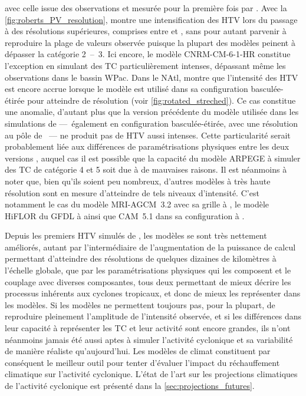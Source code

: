 \documentclass[../main.tex]{subfiles}
\begin{document}
avec celle issue des observations et mesurée pour la première fois par \textcite{atkinson_tropical_1977}. Avec la \cref{fig:roberts_PV_resolution},
\textcite{roberts_impact_2020} montre une intensification des HTV lors du passage à des résolutions supérieures, comprises entre  et , sans pour
autant parvenir à reproduire la plage de valeurs observée puisque la plupart des modèles peinent à dépasser la catégorie \num{2}~--~\num{3}. Ici encore, le
modèle CNRM-CM-6-1-HR constitue l'exception en simulant des TC particulièrement intenses, dépassant même les observations dans le bassin WPac. Dans le NAtl,
\textcite{chauvin_future_2020} montre que l'intensité des HTV est encore accrue lorsque le modèle est utilisé dans sa configuration basculée-étirée pour atteindre
 de résolution (voir \cref{fig:rotated_streched}). Ce cas constitue une anomalie, d'autant plus que la version précédente du modèle utilisée dans les
simulations de \textcite{daloz_impact_2012} ---~également en configuration basculée-étirée, avec une résolution au pôle de ~--- ne produit pas de HTV aussi
intenses. Cette particularité serait probablement liée aux différences de paramétrisations physiques entre les deux versions \parencite{chauvin_future_2020},
auquel cas il est possible que la capacité du modèle ARPEGE à simuler des TC de catégorie \num{4} et \num{5} soit due à de mauvaises raisons. Il est néanmoins à
noter que, bien qu'ils soient peu nombreux, d'autres modèles à très haute résolution sont en mesure d'atteindre de tels niveaux d'intensité. C'est notamment le
cas du modèle MRI-AGCM~3.2 avec sa grille à  \parencite{murakami_future_2012}, le modèle HiFLOR du GFDL à  \parencite{murakami_simulation_2015}
ainsi que CAM~5.1 dans sa configuration à  \parencite{wehner_effect_2014}.

Depuis les premiers HTV simulés de \textcite{manabe_tropical_1970}, les modèles se sont très nettement améliorés, autant par l'intermédiaire de l'augmentation de la
puissance de calcul permettant d'atteindre des résolutions de quelques dizaines de kilomètres à l'échelle globale, que par les paramétrisations physiques qui
les composent et le couplage avec diverses composantes, tous deux permettant de mieux décrire les processus inhérents aux cyclones tropicaux, et donc de mieux
les représenter dans les modèles. Si les modèles ne permettent toujours pas, pour la plupart, de reproduire pleinement l'amplitude de l'intensité observée, et
si les différences dans leur capacité à représenter les TC et leur activité sont encore grandes, ils n'ont néanmoins jamais été aussi aptes à simuler l'activité
cyclonique et sa variabilité de manière réaliste qu'aujourd'hui. Les modèles de climat constituent par conséquent le meilleur outil pour tenter d'évaluer
l'impact du réchauffement climatique sur l'activité cyclonique. L'état de l'art sur les projections climatiques de l'activité cyclonique est présenté dans la
\cref{sec:projections_futures}.
\end{document}
